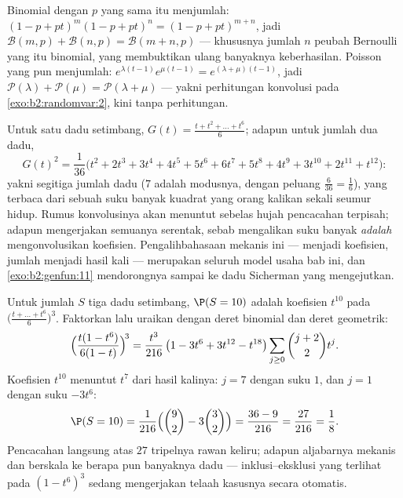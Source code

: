 \begin{example}\label{ex:b2:genfun:stability}
Binomial  dengan $p$ yang sama itu menjumlah: $(1 - p + pt)^m(1 -
p + pt)^n = (1 - p + pt)^{m+n}$, jadi $\mathcal{B}(m, p) +
\mathcal{B}(n, p) = \mathcal{B}(m + n, p)$ --- khususnya jumlah
$n$ peubah Bernoulli yang  itu binomial, yang membuktikan ulang
 banyaknya keberhasilan. Poisson yang  pun menjumlah:
$e^{\lambda(t-1)}e^{\mu(t-1)} = e^{(\lambda + \mu)(t-1)}$, jadi
$\mathcal{P}(\lambda) + \mathcal{P}(\mu) = \mathcal{P}(\lambda +
\mu)$ --- yakni perhitungan konvolusi pada
\cref{exo:b2:randomvar:2}, kini tanpa perhitungan.
\end{example}

\begin{example}\label{ex:b2:genfun:twodice}
Untuk satu dadu setimbang, $G(t) = \frac{t + t^2 + \dots + t^6}{6}$;
adapun untuk jumlah dua dadu,
\[
G(t)^2 = \frac{1}{36}\bigl(t^2 + 2t^3 + 3t^4 + 4t^5 + 5t^6 +
6t^7 + 5t^8 + 4t^9 + 3t^{10} + 2t^{11} + t^{12}\bigr) :
\]
yakni  segitiga jumlah dadu ($7$ adalah modusnya, dengan
peluang $\frac6{36} = \frac16$), yang terbaca dari sebuah suku banyak
kuadrat yang orang kalikan sekali seumur hidup. Rumus
konvolusinya akan menuntut sebelas hujah pencacahan terpisah;
adapun  mengerjakan semuanya serentak,
sebab mengalikan suku banyak \emph{adalah} mengonvolusikan koefisien.
Pengalihbahasaan mekanis ini ---  menjadi koefisien, jumlah menjadi
hasil kali --- merupakan seluruh model usaha bab ini, dan
\cref{exo:b2:genfun:11} mendorongnya sampai ke dadu Sicherman
yang mengejutkan.
\end{example}

\begin{example}\label{ex:b2:genfun:threedice}
Untuk jumlah $S$ tiga dadu setimbang, $\P(S = 10)$ adalah
koefisien $t^{10}$ pada $\bigl(\frac{t + \dots +
t^6}6\bigr)^3$. Faktorkan lalu uraikan dengan deret binomial dan
deret geometrik:
\[
\Bigl(\frac{t(1 - t^6)}{6(1 - t)}\Bigr)^{\!3}
= \frac{t^3}{216}\,\bigl(1 - 3t^6 + 3t^{12} -
t^{18}\bigr)\sum_{j\geq0}\binom{j+2}2t^j .
\]
Koefisien $t^{10}$ menuntut $t^7$ dari hasil kalinya:
$j = 7$ dengan suku $1$, dan $j = 1$ dengan suku
$-3t^6$:
\[
\P(S = 10) = \frac{1}{216}\Bigl(\binom92 -
3\binom32\Bigr) = \frac{36 - 9}{216} = \frac{27}{216} =
\frac18 .
\]
Pencacahan langsung atas $27$ tripelnya rawan keliru; adapun
aljabarnya mekanis dan berskala ke berapa pun banyaknya dadu ---
inklusi--eksklusi yang terlihat pada $(1 - t^6)^3$ sedang
mengerjakan telaah kasusnya secara otomatis.
\end{example}

